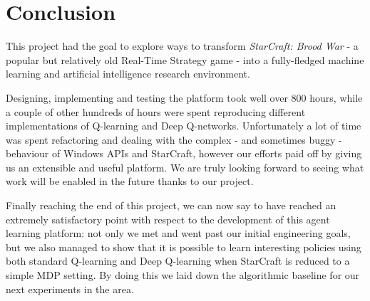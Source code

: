 \chapter{Conclusion}

This project had the goal to explore ways to transform \emph{StarCraft: Brood
  War} - a popular but relatively old Real-Time Strategy game - into a
fully-fledged machine learning and artificial intelligence research environment.

Designing, implementing and testing the platform took well over 800 hours, while
a couple of other hundreds of hours were spent reproducing different
implementations of Q-learning and Deep Q-networks. Unfortunately a lot of time
was spent refactoring and dealing with the complex - and sometimes buggy -
behaviour of Windows APIs and StarCraft, however our efforts paid off by giving
us an extensible and useful platform. We are truly looking forward to seeing
what work will be enabled in the future thanks to our project.

Finally reaching the end of this project, we can now say to have reached an
extremely satisfactory point with respect to the development of this agent
learning platform: not only we met and went past our initial engineering goals,
but we also managed to show that it is possible to learn interesting policies
using both standard Q-learning and Deep Q-learning when StarCraft is reduced to
a simple MDP setting. By doing this we laid down the algorithmic baseline for
our next experiments in the area.


